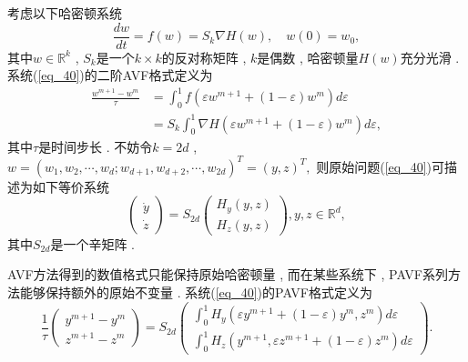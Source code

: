 考虑以下哈密顿系统
\begin{equation}
\frac{d w}{d t}=f(w)=S_{k} \nabla H(w) , \quad w(0)=w_{0} , 
\label{eq_40}\end{equation}
其中$w \in \mathbb{R}^{k}$ , $S_{k}$是一个$k \times k$的反对称矩阵 , $k$是偶数 , 哈密顿量$H(w)$充分光滑 . 
系统(\ref{eq_40})的二阶AVF格式定义为
\begin{equation}
\begin{aligned}
\frac{w^{m+1}-w^{m}}{\tau} &=\int_{0}^{1} f\left(\varepsilon w^{m+1}+(1-\varepsilon) w^{m}\right) d \varepsilon \\
&=S_{k} \int_{0}^{1} \nabla H\left(\varepsilon w^{m+1}+(1-\varepsilon) w^{m}\right) d \varepsilon , 
\end{aligned}
\label{eq_41}\end{equation}
其中$\tau$是时间步长 . 
不妨令$k=2d$ , $w=\left(w_{1} , w_{2} , \cdots , w_{d} ; w_{d+1} , w_{d+2} , \cdots , w_{2d}\right)^{T}=(y , z)^{T},$  则原始问题(\ref{eq_40})可描述为如下等价系统
\begin{equation}
\left(\begin{array}{l}
\dot{y} \\
\dot{z}
\end{array}\right)=S_{2 d}\left(\begin{array}{c}
H_{y}(y , z) \\
H_{z}(y , z)
\end{array}\right) , y , z \in \mathbb{R}^{d} , 
\label{eq_42}\end{equation}
其中$S_{2 d}$是一个辛矩阵 . 

AVF方法得到的数值格式只能保持原始哈密顿量 , 而在某些系统下 , PAVF系列方法能够保持额外的原始不变量 . 
系统(\ref{eq_40})的PAVF格式定义为
\begin{equation}
\frac{1}{\tau}\left(\begin{array}{c}
y^{m+1}-y^{m} \\
z^{m+1}-z^{m}
\end{array}\right)=S_{2 d}\left(\begin{array}{c}
\int_{0}^{1} H_{y}\left(\varepsilon y^{m+1}+(1-\varepsilon) y^{m} , z^{m}\right) d \varepsilon \\
\int_{0}^{1} H_{z}\left(y^{m+1} , \varepsilon z^{m+1}+(1-\varepsilon) z^{m}\right) d \varepsilon
\end{array}\right)  . 
\label{eq_43}\end{equation}

